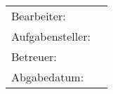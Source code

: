\begin{titlepage}
  \centering


  \vspace{5mm}
  {\huge\MakeUppercase{\getFaculty{}}}\\

  \vspace{5mm}
  {\large\MakeUppercase{\getUniversity{}}}\\

  \vspace{20mm}
  {\Large \getDoctype{}}

  \vspace{15mm}
  {\huge\bfseries \getTitleGer{}\par}

  \vspace{10mm}
  {\huge\bfseries \foreignlanguage{english}{\getTitle{}}\par}

  \vspace{15mm}
  \begin{tabular}{l l}
    Bearbeiter:          & \getAuthor{} \\
    Aufgabensteller:      & \getSupervisor{} \\
    Betreuer:         & \getAdvisor{} \\
    Abgabedatum: & \getSubmissionDate{} \\
  \end{tabular}

\end{titlepage}
